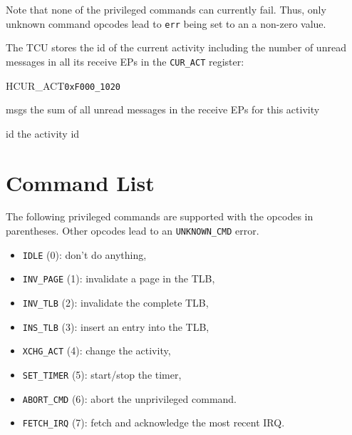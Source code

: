 \noindent Note that none of the privileged commands can currently fail. Thus, only unknown command
opcodes lead to \texttt{err} being set to an a non-zero value.

\noindent The TCU stores the id of the current activity including the number of unread messages in all
its receive EPs in the \texttt{CUR\_ACT} register:

\setlength{\regWidth}{.95\textwidth}
\begin{register}{H}{CUR\_ACT}{\texttt{0xF000\_1020}}
  \regnewline%
  \begin{regdesc}\begin{reglist}
    \item[msgs] the sum of all unread messages in the receive EPs for this activity
    \item[id] the activity id
  \end{reglist}\end{regdesc}
\end{register}
\setlength{\regWidth}{\textwidth}
\extend{}

\section{Command List}

The following privileged commands are supported with the opcodes in parentheses. Other opcodes lead
to an \texttt{UNKNOWN\_CMD} error.

\begin{itemize}
  \item \texttt{IDLE} (0):  don't do anything, \extend{}
  \item \texttt{INV\_PAGE} (1): invalidate a page in the TLB, 
  \item \texttt{INV\_TLB} (2): invalidate the complete TLB,
  \item \texttt{INS\_TLB} (3): insert an entry into the TLB, \extend{}
  \item \texttt{XCHG\_ACT} (4): change the activity, 
  \item \texttt{SET\_TIMER} (5): start/stop the timer,
  \item \texttt{ABORT\_CMD} (6): abort the unprivileged command.
  \item \texttt{FETCH\_IRQ} (7): fetch and acknowledge the most recent IRQ. \extend{}
\end{itemize}

